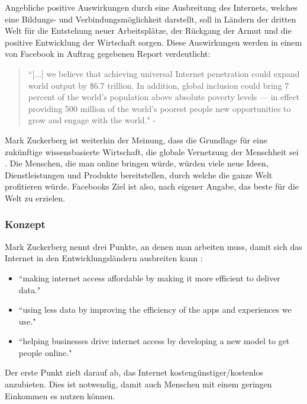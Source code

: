 \documentclass{article}
\begin{document}
Angebliche positive Auswirkungen durch eine Ausbreitung des Internets, welches eine Bildungs- und Verbindungsmöglichkeit darstellt, soll in Ländern der dritten Welt für die Entstehung neuer Arbeitsplätze, der Rückgang der Armut und die positive Entwicklung der Wirtschaft sorgen.
Diese Auswirkungen werden in einem von Facebook in Auftrag gegebenen Report verdeutlicht:

\begin{quote}
``[...] we believe that achieving universal Internet penetration could expand world output by \$6.7 trillion.  
In addition, global inclusion could bring 7 percent of the world’s population above absolute poverty levels — in effect providing 500 
million of the world’s poorest people new opportunities to grow and engage with the world." - \cite[11]{connectWorld}
\end{quote}

Mark Zuckerberg ist weiterhin der Meinung, dass die Grundlage für eine zukünftige wissensbasierte Wirtschaft, die globale Vernetzung der Menschheit sei \parencite{HumanRight}.
Die Menschen, die man online bringen würde, würden viele neue Ideen, Dienstleistungen und Produkte bereitstellen, durch welche die ganze Welt profitieren würde.
Facebooks Ziel ist also, nach eigener Angabe, das beste für die Welt zu erzielen.

\subsubsection{Konzept}
        
Mark Zuckerberg nennt drei Punkte, an denen man arbeiten muss, damit sich das Internet in den Entwicklungsländern ausbreiten kann
\parencite{HumanRight}:

\begin{itemize}
\item ``making internet access affordable by making it more efficient to deliver data."
\item ``using less data by improving the efficiency of the apps and experiences we use."
\item ``helping businesses drive internet access by developing a new model to get people online."  
\end{itemize}

Der erste Punkt zielt darauf ab, das Internet kostengünstiger/kostenlos anzubieten. 
Dies ist notwendig, damit auch Menschen mit einem geringen Einkommen es nutzen können.
\end{document}
